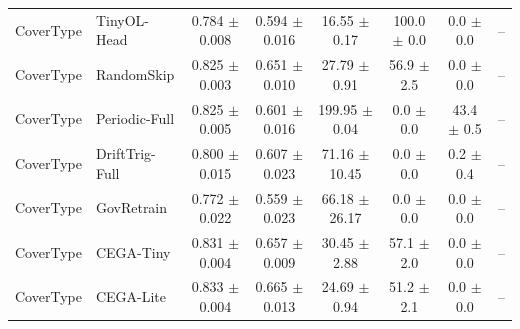 \begin{table}[t]
{\begin{tabular}{llcccccc}
CoverType & TinyOL-Head & 0.784 $\pm$ 0.008 & 0.594 $\pm$ 0.016 & 16.55 $\pm$ 0.17 & 100.0 $\pm$ 0.0 & 0.0 $\pm$ 0.0 & -- \\
CoverType & RandomSkip & 0.825 $\pm$ 0.003 & 0.651 $\pm$ 0.010 & 27.79 $\pm$ 0.91 & 56.9 $\pm$ 2.5 & 0.0 $\pm$ 0.0 & -- \\
CoverType & Periodic-Full & 0.825 $\pm$ 0.005 & 0.601 $\pm$ 0.016 & 199.95 $\pm$ 0.04 & 0.0 $\pm$ 0.0 & 43.4 $\pm$ 0.5 & -- \\
CoverType & DriftTrig-Full & 0.800 $\pm$ 0.015 & 0.607 $\pm$ 0.023 & 71.16 $\pm$ 10.45 & 0.0 $\pm$ 0.0 & 0.2 $\pm$ 0.4 & -- \\
CoverType & GovRetrain & 0.772 $\pm$ 0.022 & 0.559 $\pm$ 0.023 & 66.18 $\pm$ 26.17 & 0.0 $\pm$ 0.0 & 0.0 $\pm$ 0.0 & -- \\
CoverType & CEGA-Tiny & 0.831 $\pm$ 0.004 & 0.657 $\pm$ 0.009 & 30.45 $\pm$ 2.88 & 57.1 $\pm$ 2.0 & 0.0 $\pm$ 0.0 & -- \\
CoverType & CEGA-Lite & 0.833 $\pm$ 0.004 & 0.665 $\pm$ 0.013 & 24.69 $\pm$ 0.94 & 51.2 $\pm$ 2.1 & 0.0 $\pm$ 0.0 & -- \\
\bottomrule
\end{tabular}}
\end{table}